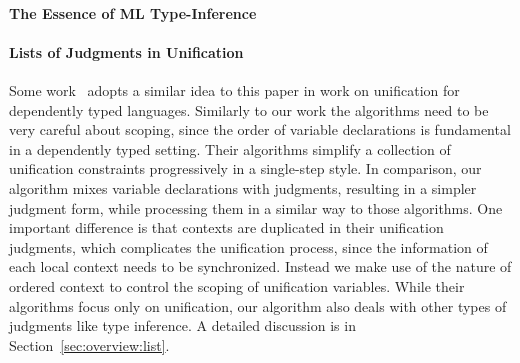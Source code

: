 \paragraph{The Essence of ML Type-Inference} 

\paragraph{Lists of Judgments in Unification}
Some work~\cite{Reed2009,Abel2011higher} adopts a similar idea to this paper
in work on unification for dependently typed languages. Similarly to our work
the algorithms need to be very careful about scoping, since the order of variable
declarations is fundamental in a dependently typed setting. 
Their algorithms simplify a collection of unification constraints progressively in a single-step style.
In comparison, our algorithm mixes variable declarations with judgments,
resulting in a simpler judgment form,
while processing them in a similar way to those algorithms.
One important difference is that contexts are
duplicated in their unification judgments, which complicates the unification process,
since the information of each local context needs to be synchronized.
Instead we make use of the nature of ordered context to control the scoping of unification variables.
While their algorithms focus only on unification,
our algorithm also deals with other types of judgments like type inference.
A detailed discussion is in Section~\ref{sec:overview:list}.
